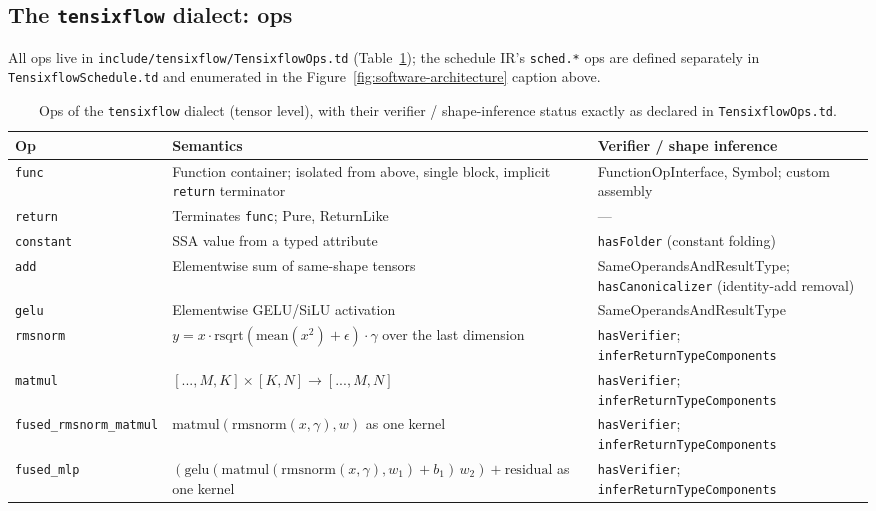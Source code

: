 \subsection{The \texttt{tensixflow} dialect: ops}

All ops live in \texttt{include/tensixflow/TensixflowOps.td}
(Table~\ref{tab:software-ops}); the schedule IR's \texttt{sched.*} ops are
defined separately in \texttt{TensixflowSchedule.td} and enumerated in the
Figure~\ref{fig:software-architecture} caption above.

\begin{table}[htbp]
  \centering
  \caption{Ops of the \texttt{tensixflow} dialect (tensor level), with their
  verifier / shape-inference status exactly as declared in
  \texttt{TensixflowOps.td}.}
  \label{tab:software-ops}
  \small
  \begin{tabular}{@{}p{4.3cm}p{6.2cm}p{4.6cm}@{}}
    \toprule
    \textbf{Op} & \textbf{Semantics} & \textbf{Verifier / shape inference} \\
    \midrule
    \texttt{func} & Function container; isolated from above, single block, implicit \texttt{return} terminator & FunctionOpInterface, Symbol; custom assembly \\
    \texttt{return} & Terminates \texttt{func}; Pure, ReturnLike & --- \\
    \texttt{constant} & SSA value from a typed attribute & \texttt{hasFolder} (constant folding) \\
    \texttt{add} & Elementwise sum of same-shape tensors & SameOperandsAndResultType; \texttt{hasCanonicalizer} (identity-add removal) \\
    \texttt{gelu} & Elementwise GELU/SiLU activation & SameOperandsAndResultType \\
    \texttt{rmsnorm} & $y = x \cdot \mathrm{rsqrt}(\mathrm{mean}(x^2)+\epsilon) \cdot \gamma$ over the last dimension & \texttt{hasVerifier}; \texttt{inferReturnTypeComponents} \\
    \texttt{matmul} & $[...,M,K] \times [K,N] \to [...,M,N]$ & \texttt{hasVerifier}; \texttt{inferReturnTypeComponents} \\
    \texttt{fused\_rmsnorm\_matmul} & $\mathrm{matmul}(\mathrm{rmsnorm}(x,\gamma), w)$ as one kernel & \texttt{hasVerifier}; \texttt{inferReturnTypeComponents} \\
    \texttt{fused\_mlp} & $(\mathrm{gelu}(\mathrm{matmul}(\mathrm{rmsnorm}(x,\gamma),w_1)+b_1)\, w_2) + \mathrm{residual}$ as one kernel & \texttt{hasVerifier}; \texttt{inferReturnTypeComponents} \\
    \bottomrule
  \end{tabular}
\end{table}

